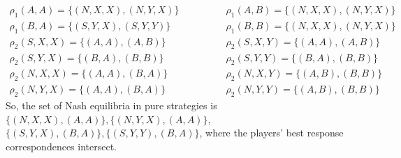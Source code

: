 \documentclass[]{article}
\begin{document}
\begin{enumerate}[label=(\roman*)]
	\begin{equation}
		\begin{split}
		\rho_1(A, A) = \{(N, X, X), (N, Y, X)\} \qquad & \qquad \rho_1(A, B) = \{(N, X, X), (N, Y, X)\} \\ \nonumber
		\rho_1(B, A) = \{(S, Y, X), (S, Y, Y)\} \qquad & \qquad \rho_1(B, B) = \{(N, X, X), (N, Y, X)\} \\
		\rho_2(S, X, X) = \{(A, A), (A, B)\} \qquad & \qquad \rho_2(S, X, Y) = \{(A, A), (A, B)\} \\
		\rho_2(S, Y, X) = \{(B, A), (B, B)\} \qquad & \qquad \rho_2(S, Y, Y) = \{(B, A), (B, B)\} \\
		\rho_2(N, X, X) = \{(A, A), (B, A)\} \qquad & \qquad \rho_2(N, X, Y) = \{(A, B), (B, B)\} \\
		\rho_2(N, Y, X) = \{(A, A), (B, A)\} \qquad & \qquad \rho_2(N, Y, Y) = \{(A, B), (B, B)\}
		\end{split}
	\end{equation}
	So, the set of Nash equilibria in pure strategies is $\{(N, X, X), (A, A)\}, \{(N, Y, X), (A, A)\}$, $\{(S, Y, X), (B, A)\}, \{(S, Y, Y), (B, A)\}$, where the players' best response correspondences intersect.
\end{enumerate}
\end{document}
